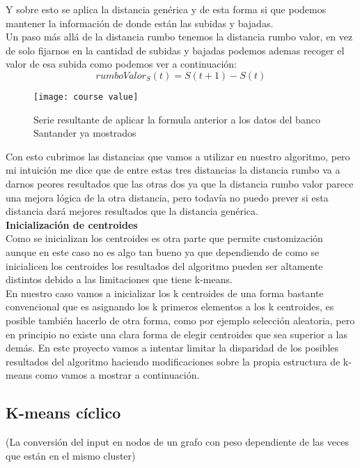 \documentclass[12pt,a4paper]{article}
\begin{document}
			Y sobre esto se aplica la distancia genérica y de esta forma si que podemos mantener la información de donde están las subidas y bajadas.\\
			Un paso más allá de la distancia rumbo tenemos la distancia rumbo valor, en vez de solo fijarnos en la cantidad de subidas y bajadas podemos ademas recoger el valor de esa subida como podemos ver a continuación:\\
			\[rumboValor_S(t)= S(t+1) - S(t)\]
\begin{figure}[H]
\centering
  \centering
  \texttt{[image: course value]}
\caption{Serie resultante de aplicar la formula anterior a los datos del banco Santander ya mostrados}
\label{fig:test}
\end{figure}
			Con esto cubrimos las distancias que vamos a utilizar en nuestro algoritmo, pero mi intuición me dice que de entre estas tres distancias la distancia rumbo va a darnos peores resultados que las otras dos ya que la distancia rumbo valor parece una mejora lógica de la otra distancia, pero todavía no puedo prever si esta distancia dará mejores resultados que la distancia genérica.\\
			\textbf{Inicialización de centroides}\\
			Como se inicializan los centroides es otra parte que permite customización aunque en este caso no es algo tan bueno ya que dependiendo de como se inicialicen los centroides los resultados del algoritmo pueden ser altamente distintos debido a las limitaciones que tiene k-means.\\
			En nuestro caso vamos a inicializar los k centroides de una forma bastante convencional que es asignando los k primeros elementos a los k centroides, es posible también hacerlo de otra forma, como por ejemplo selección aleatoria, pero en principio no existe una clara forma de elegir centroides que sea superior a las demás.
			En este proyecto vamos a intentar limitar la disparidad de los posibles resultados del algoritmo haciendo modificaciones sobre la propia estructura de k-means como vamos a mostrar a continuación.
			\subsection{K-means cíclico}
			
			(La conversión del input en nodos de un grafo con peso dependiente de las veces que están en el mismo cluster)
\end{document}
